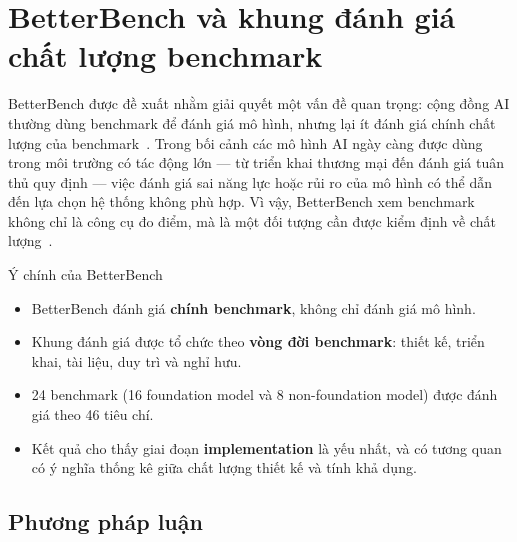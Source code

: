 
\section{BetterBench và khung đánh giá chất lượng benchmark}
\label{sec:betterbench}

BetterBench được đề xuất nhằm giải quyết một vấn đề quan trọng: cộng đồng AI thường dùng benchmark để đánh giá mô hình, nhưng lại ít đánh giá chính chất lượng của benchmark~\cite{betterbench}. Trong bối cảnh các mô hình AI ngày càng được dùng trong môi trường có tác động lớn --- từ triển khai thương mại đến đánh giá tuân thủ quy định --- việc đánh giá sai năng lực hoặc rủi ro của mô hình có thể dẫn đến lựa chọn hệ thống không phù hợp. Vì vậy, BetterBench xem benchmark không chỉ là công cụ đo điểm, mà là một đối tượng cần được kiểm định về chất lượng~\cite{betterbench}.

\begin{summarybox}{Ý chính của BetterBench}
\begin{itemize}
    \item BetterBench đánh giá \textbf{chính benchmark}, không chỉ đánh giá mô hình.
    \item Khung đánh giá được tổ chức theo \textbf{vòng đời benchmark}: thiết kế, triển khai, tài liệu, duy trì và nghỉ hưu.
    \item 24 benchmark (16 foundation model và 8 non-foundation model) được đánh giá theo 46 tiêu chí.
    \item Kết quả cho thấy giai đoạn \textbf{implementation} là yếu nhất, và có tương quan có ý nghĩa thống kê giữa chất lượng thiết kế và tính khả dụng.
\end{itemize}
\end{summarybox}

\subsection{Phương pháp luận}

